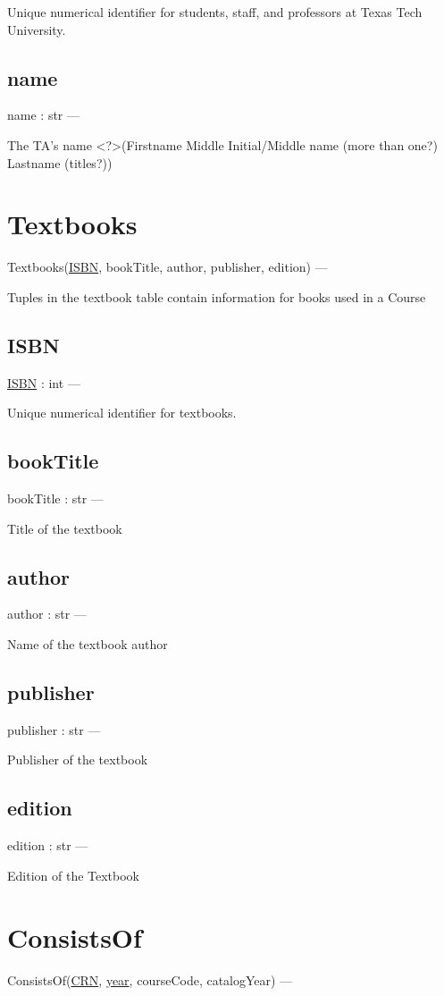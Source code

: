\documentclass[10pt]{article}
\begin{document}
		Unique numerical identifier for students, staff, and professors at Texas Tech University.
		
	\subsection{name}
		name : str ---
		
		The TA's name <?>(Firstname Middle Initial/Middle name (more than one?)
		Lastname (titles?))
	
	
\section{Textbooks}
Textbooks(\underline{ISBN}, bookTitle, author, publisher, edition) ---

Tuples in the textbook table contain information for books used in a Course

	\subsection{ISBN}
	\underline{ISBN} : int ---
	
	Unique numerical identifier for textbooks.
	
	\subsection{bookTitle}
	bookTitle : str ---
	
	Title of the textbook
	
	\subsection{author}
	author : str ---
	
	Name of the textbook author
	
	\subsection{publisher}
	publisher : str ---
	
	Publisher of the textbook
	
	\subsection{edition}
	edition : str ---
	
	Edition of the Textbook


\section{ConsistsOf}
ConsistsOf(\underline{CRN}, \underline{year}, courseCode, catalogYear) ---
\end{document}
